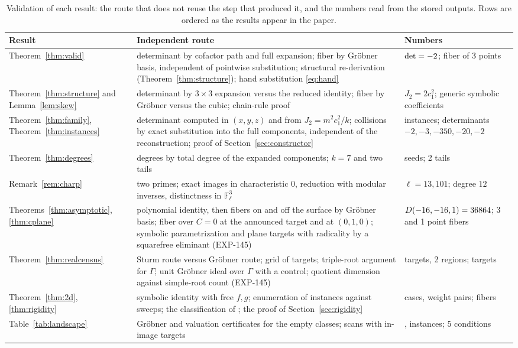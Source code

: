 \documentclass[11pt]{article}
\theoremstyle{definition}
\theoremstyle{remark}
\begin{document}
\begin{table}[t]\centering\footnotesize
\begin{tabular}{>{\raggedright\arraybackslash}p{}>{\raggedright\arraybackslash}p{}>{\raggedright\arraybackslash}p{}}
\toprule
Result & Independent route & Numbers \\
\midrule
Theorem~\ref{thm:valid} & determinant by cofactor path and full expansion; fiber by Gr\"obner basis, independent of pointwise substitution; structural re-derivation (Theorem~\ref{thm:structure}); hand substitution \eqref{eq:hand} & $\det = -2$; fiber of 3 points \\
Theorem~\ref{thm:structure} and Lemma~\ref{lem:skew} & determinant by $3\times 3$ expansion versus the reduced identity; fiber by Gr\"obner versus the cubic; chain-rule proof & $J_2 = 2c_1^2$; generic symbolic coefficients \\
Theorem~\ref{thm:family}, Theorem~\ref{thm:instances} & determinant computed in $(x,y,z)$ and from $J_2 = m^2c_1^2/k$; collisions by exact substitution into the full components, independent of the reconstruction; proof of Section~\ref{sec:constructor} & 5 instances; determinants $-2,-3,-350,-20,-2$ \\
Theorem~\ref{thm:degrees} & degrees by total degree of the expanded components; $k = 7$ and two tails & 4 seeds; 2 tails \\
Remark~\ref{rem:charp} & two primes; exact images in characteristic $0$, reduction with modular inverses, distinctness in $\mathbb{F}_\ell^3$ & $\ell = 13, 101$; degree $12$ \\
Theorems~\ref{thm:asymptotic}, \ref{thm:cplane} & polynomial identity, then fibers on and off the surface by Gr\"obner basis; fiber over $C = 0$ at the announced target and at $(0,1,0)$; symbolic parametrization and \numPlaneTargets{} plane targets with radicality by a squarefree eliminant (EXP-145) & $D(-16,-16,1) = 36864$; 3 and 1 point fibers \\
Theorem~\ref{thm:realcensus} & Sturm route versus Gr\"obner route; grid of \numGrid{} targets; triple-root argument for $\Gamma$; unit Gr\"obner ideal over $\Gamma$ with a control; quotient dimension against simple-root count (EXP-145) & 6 targets, 2 regions; \numImgTargets{} targets \\
Theorem~\ref{thm:2d}, \ref{thm:rigidity} & symbolic identity with free $f,g$; enumeration of \numEnumInst{} instances against sweeps; the classification of \cite{Shaska2026}; the proof of Section~\ref{sec:rigidity} & \numRigCases{} cases, \numWeightPairs{} weight pairs; \numEnumFibers{} fibers \\
Table~\ref{tab:landscape} & Gr\"obner and valuation certificates for the empty classes; scans with in-image targets & \numBridgeInst{}, \numRigidInst{} instances; 5 conditions \\
\bottomrule
\end{tabular}
\caption{Validation of each result: the route that does not reuse the step that produced it, and the numbers read from the stored outputs. Rows are ordered as the results appear in the paper.}
\label{tab:validation}
\end{table}
\end{document}
